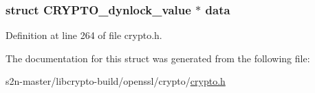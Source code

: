 \subsubsection[{\texorpdfstring{data}{data}}]{\setlength{\rightskip}{0pt plus 5cm}struct C\+R\+Y\+P\+T\+O\+\_\+dynlock\+\_\+value $\ast$ data}\hypertarget{struct_c_r_y_p_t_o__dynlock_a50d3bc271091107e90b4b18b9c8f380e}{}\label{struct_c_r_y_p_t_o__dynlock_a50d3bc271091107e90b4b18b9c8f380e}


Definition at line 264 of file crypto.\+h.



The documentation for this struct was generated from the following file\+:\begin{DoxyCompactItemize}
\item 
s2n-\/master/libcrypto-\/build/openssl/crypto/\hyperlink{crypto_2crypto_8h}{crypto.\+h}\end{DoxyCompactItemize}
